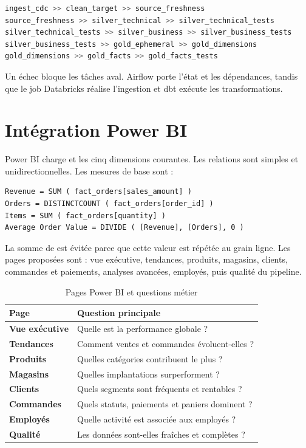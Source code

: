 \begin{lstlisting}[language=Python,caption={Topologie simplifiée du DAG}]
ingest_cdc >> clean_target >> source_freshness
source_freshness >> silver_technical >> silver_technical_tests
silver_technical_tests >> silver_business >> silver_business_tests
silver_business_tests >> gold_ephemeral >> gold_dimensions
gold_dimensions >> gold_facts >> gold_facts_tests
\end{lstlisting}

Un échec bloque les tâches aval. Airflow porte l'état et les dépendances, tandis que le job Databricks réalise l'ingestion et dbt exécute les transformations.

\section{Intégration Power BI}
Power BI charge  et les cinq dimensions courantes. Les relations sont simples et unidirectionnelles. Les mesures de base sont :

\begin{lstlisting}[language={},caption={Mesures DAX fondamentales}]
Revenue = SUM ( fact_orders[sales_amount] )
Orders = DISTINCTCOUNT ( fact_orders[order_id] )
Items = SUM ( fact_orders[quantity] )
Average Order Value = DIVIDE ( [Revenue], [Orders], 0 )
\end{lstlisting}

La somme de  est évitée parce que cette valeur est répétée au grain ligne. Les pages proposées sont : vue exécutive, tendances, produits, magasins, clients, commandes et paiements, analyses avancées, employés, puis qualité du pipeline.

\begin{table}[htbp]
\centering
\caption{Pages Power BI et questions métier}
\label{tab:powerbi-pages}
\begin{tabularx}{\textwidth}{>{\bfseries}p{4.2cm}X}
\toprule
Page & Question principale \\
\midrule
Vue exécutive & Quelle est la performance globale ? \\
Tendances & Comment ventes et commandes évoluent-elles ? \\
Produits & Quelles catégories contribuent le plus ? \\
Magasins & Quelles implantations surperforment ? \\
Clients & Quels segments sont fréquents et rentables ? \\
Commandes & Quels statuts, paiements et paniers dominent ? \\
Employés & Quelle activité est associée aux employés ? \\
Qualité & Les données sont-elles fraîches et complètes ? \\
\bottomrule
\end{tabularx}
\end{table}

